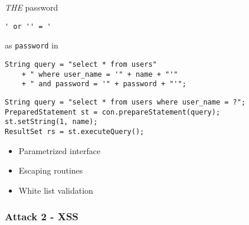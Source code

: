 \begin{frame}[fragile]
\begin{exampleblock}{\emph{THE} password}
\begin{lstlisting}
' or '' = '
\end{lstlisting}
\pause
as \texttt{password} in
\begin{lstlisting}
String query = "select * from users"
	+ " where user_name = '" + name + "'"
	+ " and password = '" + password + "'";
\end{lstlisting}
\end{exampleblock}
\end{frame}

\begin{frame}[fragile]
\begin{lstlisting}
String query = "select * from users where user_name = ?";
PreparedStatement st = con.prepareStatement(query);
st.setString(1, name);
ResultSet rs = st.executeQuery();
\end{lstlisting}
\pause
\begin{itemize}
\item Parametrized interface
\item Escaping routines
\item White list validation
\end{itemize}
\end{frame}

\subsubsection{Attack 2 - XSS}

